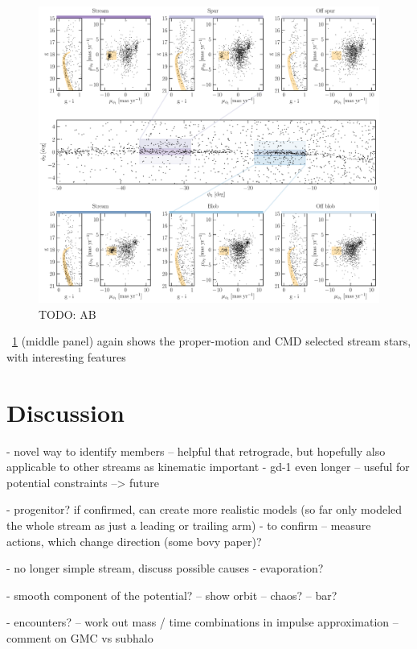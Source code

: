 \documentclass[modern]{aastex62}
\newcommand{\todo}[1]{{\color{red} TODO: #1}}
\begin{document}
\begin{figure}[h]
\begin{center}
\includegraphics[width=\textwidth]{features.pdf}
\end{center}
\caption{%
\todo{AB}
\label{fig:features}
}
\end{figure}

\figurename~\ref{fig:features} (middle panel) again shows the proper-motion and CMD selected stream stars, with interesting features

\section{Discussion}
\label{sec:discussion}

- novel way to identify members -- helpful that retrograde, but hopefully also applicable to other streams as kinematic important
- gd-1 even longer -- useful for potential constraints --> future

- progenitor? if confirmed, can create more realistic models (so far only modeled the whole stream as just a leading or trailing arm)
- to confirm -- measure actions, which change direction (some bovy paper)?

- no longer simple stream, discuss possible causes
- evaporation?

- smooth component of the potential?
-- show orbit
-- chaos?
-- bar?

- encounters?
-- work out mass / time combinations in impulse approximation
-- comment on GMC vs subhalo
\end{document}
